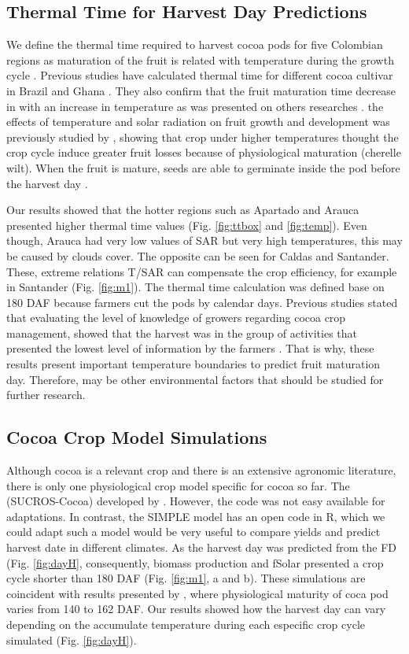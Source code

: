 \documentclass[gene,journal,article,submit,moreauthors,pdftex]{Definitions/mdpi}
\begin{document}
\subsection{Thermal Time for Harvest Day Predictions}
We define the thermal time required to harvest cocoa pods for five Colombian regions as maturation of the fruit is related with temperature during the growth cycle \citep{lopez2018}. Previous studies have calculated thermal time for  different cocoa cultivar in Brazil and Ghana \cite{Daymond2008}. They also confirm that the fruit maturation time decrease in with an increase in temperature as was presented on others researches \citep{Alvim1974, End1991, Daymond2008}. the effects of temperature and solar radiation on fruit growth and development was previously studied by \cite{Daymond2008}, showing that crop under higher temperatures thought the crop cycle induce greater fruit losses because of physiological maturation (cherelle wilt). When the fruit is mature, seeds are able to germinate inside the pod before the harvest day \citep{lopez2018}.

Our results showed that the hotter regions such as Apartado and Arauca presented higher thermal time values (Fig. \ref{fig:ttbox} and \ref{fig:temp}). Even though, Arauca had very low values of SAR but very high temperatures, this may be caused by clouds cover. The opposite can be seen for Caldas and Santander. These, extreme relations T/SAR can compensate the crop efficiency, for example in Santander (Fig. \ref{fig:m1}).  The thermal time calculation was defined base on  180 DAF because farmers cut the pods by calendar days. Previous studies stated that evaluating the level of knowledge of growers regarding cocoa crop management, showed that the harvest was in the group of activities that presented the lowest level of information by the farmers \citep{Gutierrez2020}. That is why, these results present important temperature boundaries to predict fruit maturation day. Therefore, may be other environmental factors that should be studied for further research. 

\subsection{Cocoa Crop Model Simulations}
Although cocoa is a relevant crop and there is an extensive agronomic literature, there is only one physiological crop model specific for cocoa so far. The (SUCROS-Cocoa) developed by \cite{zuidema2005}. However, the code was not easy available for adaptations. In contrast, the SIMPLE model has an open code in R, which we could adapt such a model would be very useful to compare yields and predict harvest date in different climates. As the harvest day was predicted from the FD (Fig. \ref{fig:dayH}, consequently, biomass production and fSolar presented a crop cycle shorter than 180 DAF (Fig. \ref{fig:m1}, a and b). These simulations are coincident with results presented by \cite{lopez2018}, where physiological maturity of coca pod varies from 140 to 162 DAF.  Our results showed how the harvest day can vary depending on the accumulate temperature during each especific crop cycle simulated (Fig. \ref{fig:dayH}).
\end{document}
